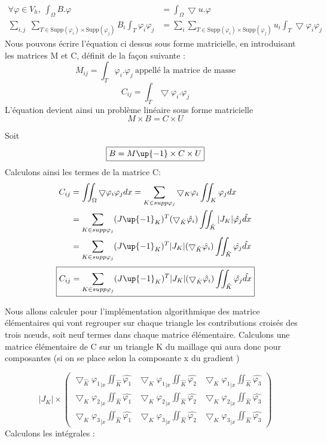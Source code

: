 \documentclass[a4paper,12pt,titlepage]{report}
\begin{document}
\begin{onehalfspace}
\[
\begin{aligned}
		\forall \varphi \in V_{h} , \ \int_{\Omega}B.  \varphi &= \int_{\Omega}\bigtriangledown u.\varphi  \\
		\sum_{i,j}\;  \sum_{T \in \text{Supp}(\varphi_{i})\times \text{Supp}(\varphi_{j})}B_{i}\int_{T} \varphi_i\varphi_j & =  \sum_{i}  \sum_{T \in \text{Supp}(\varphi_{i})\times \text{Supp}(\varphi_{j})} u_i \int_{T}\bigtriangledown\varphi_i\varphi_j  
\end{aligned}
\]
Nous pouvons écrire l'équation ci dessus sous forme matricielle, en introduisant les matrices M et C, définit de la façon suivante :
\[
		M_{ij}=\int_{T} \varphi_i.\varphi_j \ \text{appellé la matrice de masse}
\]
\[
		C_{ij}=\int_{T} \bigtriangledown\varphi_i.\varphi_j 
\]
L'équation devient ainsi un problème linéaire sous forme matricielle  
\[
	M \times B=C \times U
\] 

Soit 
\[
	\boxed{B =M\up{-1}\times C \times U}
\]
Calculons ainsi les termes de la matrice C:
\[
\begin{aligned}
C_{ij} &= \iint_{\Omega}\bigtriangledown\varphi_i\varphi_j dx      
       = \sum_{K\in supp\varphi_j}\bigtriangledown_K\varphi_i \iint_{K} \varphi_jdx \\
	 &= \sum_{K\in supp\varphi_j}(J\up{-1}_K)^{T}(\bigtriangledown_{\hat{K}} \hat{\varphi_i})\iint_{\hat{K}}  |J_{K}| \hat{\varphi_j}\hat{dx} \\
	&= \sum_{K\in supp\varphi_j}(J\up{-1}_K)^{T}|J_K| (\bigtriangledown_{\hat{K} }\hat{\varphi_i})\iint_{\hat{K}}  \hat{\varphi_j}\hat{dx}
\end{aligned}
\]
\[\boxed{C_{ij} =  \sum_{K\in supp\varphi_j}(J\up{-1}_K)^{T}|J_K| (\bigtriangledown_{\hat{K} }\hat{\varphi_i})\iint_{\hat{K}}  \hat{\varphi_j}\hat{dx}} \]

Nous allons calculer pour l'implémentation algorithmique des matrice élémentaires qui vont regrouper sur chaque triangle les contributions croisés des trois nœuds, soit neuf termes dans chaque matrice élémentaire.
\newline
Calculons une matrice élémentaire de C sur un triangle K du maillage qui aura donc pour composantes (si on se place selon la composante x du gradient ) 

\[
|J_K| \times
\begin{pmatrix}
   	\bigtriangledown_{\hat{K} }{\varphi_1}_{|x}\iint_{\hat{K}}  \hat{\varphi_1}&\bigtriangledown_{K}{\varphi_1}_{|x}\iint_{\hat{K} } \hat{\varphi_2} &\bigtriangledown_{K}{\varphi_1}_{|x}\iint_{\hat{K} } \hat{\varphi_3}\\ 
  \bigtriangledown_{K }{\varphi_2}_{|x}\iint_{\hat{K }} \hat{\varphi_1} & \bigtriangledown_{K }{\varphi_2}_{|x}\iint_{\hat{K} }\hat{\varphi_2} & \bigtriangledown_{K }{\varphi_2}_{|x}\iint_	{\hat{K} } \hat{\varphi_3} \\
  \bigtriangledown_{K }{\varphi_3}_{|x}\iint_{\hat{K} } \hat{\varphi_1}&\bigtriangledown_{K }{\varphi_3}_{|x}\iint_{\hat{K} } \hat{\varphi_2} & \bigtriangledown_{K}{\varphi_3}_{|x}\iint_{\hat{K} } \hat{\varphi_3}
\end{pmatrix} 
\]
Calculons les intégrales :



\end{onehalfspace}
\end{document}
